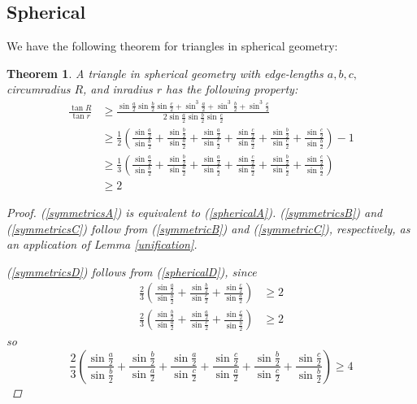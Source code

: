 \documentclass[12pt,notitlepage]{amsart}%
\newtheorem{theorem}{Theorem}[section]
\newcommand{\s}[1]{\sin \frac{#1}{2}}
\newcommand{\fracsums}{\frac{\s{a}}{\s{b}}+\frac{\s{b}}{\s{c}}+\frac{\s{c}}{\s{a}}}
\newcommand{\fracsyms}{\frac{\s{a}}{\s{b}}+\frac{\s{b}}{\s{a}}+\frac{\s{a}}{\s{c}}+\frac{\s{c}}{\s{a}}+\frac{\s{b}}{\s{c}}+\frac{\s{c}}{\s{b}}}
\begin{document}
\subsection{Spherical}\label{(sphericalsym)}
We have the following theorem for triangles in spherical geometry:
\begin{theorem}
	A triangle in spherical geometry with edge-lengths $a,b,c,$ circumradius $R$, and inradius $r$ has the following property:
	\begin{subequations}
	\begin{align}
    \frac{\tan R}{\tan r}&\geq \frac{\s{a}\s{b}\s{c}+\sin^3\frac{a}{2}+\sin^3\frac{b}{2}+\sin^3\frac{c}{2}}{2\s{a}\s{b}\s{c}}\label{symmetricsA}\\
    &\geq \frac{1}{2}\left( \fracsyms\right) -1\label{symmetricsB}\\
    &\geq \frac{1}{3}\left( \fracsyms\right)\label{symmetricsC}\\
    &\geq 2\label{symmetricsD}
    \end{align}
	\end{subequations}
    \begin{proof}
    	(\ref{symmetricsA}) is equivalent to (\ref{sphericalA}). (\ref{symmetricsB}) and  (\ref{symmetricsC}) follow from (\ref{symmetricB}) and (\ref{symmetricC}), respectively, as an application of Lemma \ref{unification}.
        
        (\ref{symmetricsD}) follows from (\ref{sphericalD}), since 
        \begin{align*}
        	\frac{2}{3}\left( \fracsums\right) &\geq2\\
            \frac{2}{3}\left( \frac{\s{b}}{\s{a}}+\frac{\s{a}}{\s{c}}+\frac{\s{c}}{\s{b}}\right) &\geq2
        \end{align*}
        so
        \[\frac{2}{3}\left( \fracsyms\right) \geq 4\]
        \end{proof}
\end{theorem}
\end{document}
